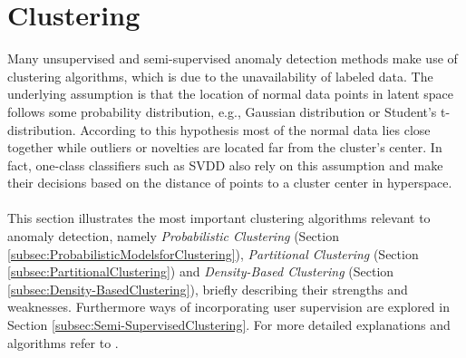\section{Clustering}
\label{sec:Clustering}
Many unsupervised and semi-supervised anomaly detection methods make use of clustering algorithms, which is due to the unavailability of labeled data. The underlying assumption is that the location of normal data points in latent space follows some probability distribution, e.g., Gaussian distribution or Student's t-distribution. According to this hypothesis most of the normal data lies close together while outliers or novelties are located far from the cluster's center. In fact, one-class classifiers such as SVDD \cite{SVDD} also rely on this assumption and make their decisions based on the distance of points to a cluster center in hyperspace. \\
\\
This section illustrates the most important clustering algorithms relevant to anomaly detection, namely \textit{Probabilistic Clustering} (Section \ref{subsec:ProbabilisticModelsforClustering}), \textit{Partitional Clustering} (Section \ref{subsec:PartitionalClustering}) and \textit{Density-Based Clustering} (Section \ref{subsec:Density-BasedClustering}), briefly describing their strengths and weaknesses. Furthermore ways of incorporating user supervision are explored in Section \ref{subsec:Semi-SupervisedClustering}. For more detailed explanations and algorithms refer to \cite{DataClustering}.

